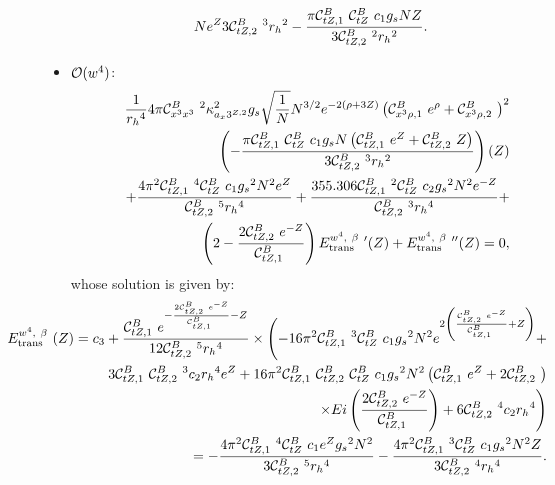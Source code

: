 \begin{itemize}
{\begin{eqnarray}
{   N e^Z}{3 {\cal C}_{tZ,2}^B\ ^3 {r_h}^2}-\frac{\pi 
   {\cal C}_{tZ,1}^B\  {\cal C}_{tZ}^B\  c_1 {g_s} N Z}{3
   {\cal C}_{tZ,2}^B\ ^2 {r_h}^2}.
\end{eqnarray}
}
\item
${\cal O}(w^4)$:\\
\begin{eqnarray}
\label{EOMw4}
& & \hskip -0.5in \frac{1}{{{r_h}^4}}4 \pi  {\cal C}_{x^3x^3}^B\ ^2 \kappa_{a_x3^{Z,2}}^2 {g_s}
   \sqrt{\frac{1}{N}} N^{3/2} e^{-2 (\rho +3 Z)}
    \left({\cal C}_{x^3\rho,1}^B\  e^{\rho }+{\cal C}_{x^3\rho, 2}^B\ \right)^2 \nonumber \\ & & \left(-\frac{\pi  {\cal C}_{tZ,1}^B\ 
   {\cal C}_{tZ}^B\  c_1 {g_s} N \left({\cal C}_{tZ,1}^B\ 
   e^Z+{\cal C}_{tZ,2}^B\  Z\right)}{3 {\cal C}_{tZ,2}^B\ ^3
   {r_h}^2}\right)(Z)\nonumber\\
& & +\frac{4 \pi ^2
   {\cal C}_{tZ,1}^B\ ^4 {\cal C}_{tZ}^B\  c_1 {g_s}^2 N^2
   e^Z}{{\cal C}_{tZ,2}^B\ ^5 {r_h}^4}+\frac{355.306
   {\cal C}_{tZ,1}^B\ ^2 {\cal C}_{tZ}^B\  c_2 {g_s}^2 N^2
        e^{-Z}}{{\cal C}_{tZ,2}^B\ ^3 {r_h}^4}+ \nonumber \\ & & \left(2-\frac{2
   {\cal C}_{tZ,2}^B\  e^{-Z}}{{\cal C}_{tZ,1}^B\ }\right)
   E_{\rm trans}^{w^4,\ \beta}\ '(Z) + E_{\rm trans}^{w^4,\ \beta}\ ''(Z)=0,
\end{eqnarray}
whose solution is given by:
{\footnotesize
\begin{eqnarray}
\label{EOMw4-sol}
& & \hskip -0.8in E_{\rm trans}^{w^4,\ \beta}\ (Z) = c_3 + \frac{{\cal C}_{tZ,1}^B\  e^{-\frac{2
   {\cal C}_{tZ,2}^B\  e^{-Z}}{{\cal C}_{tZ,1}^B\ }-Z} }{12
   {\cal C}_{tZ,2}^B\ ^5 {r_h}^4} \times \Biggl(-16 \pi
   ^2 {\cal C}_{tZ,1}^B\ ^3 {\cal C}_{tZ}^B\  c_1 {g_s}^2 N^2
   e^{2 \left(\frac{{\cal C}_{tZ,2}^B\ 
   e^{-Z}}{{\cal C}_{tZ,1}^B\ }+Z\right)}+ \nonumber \\ 
& & 3 {\cal C}_{tZ,1}^B\ 
   {\cal C}_{tZ,2}^B\ ^3 c_2 {r_h}^4 e^Z+16 \pi ^2
   {\cal C}_{tZ,1}^B\  {\cal C}_{tZ,2}^B\  {\cal C}_{tZ}^B\  c_1
   {g_s}^2 N^2 \left({\cal C}_{tZ,1}^B\  e^Z+2
   {\cal C}_{tZ,2}^B\ \right)\nonumber\\
& & \times    {Ei}\left(\frac{2
   {\cal C}_{tZ,2}^B\  e^{-Z}}{{\cal C}_{tZ,1}^B\ }\right)+6
   {\cal C}_{tZ,2}^B\ ^4 c_2 {r_h}^4\Biggr) \nonumber \\ 
& & = -\frac{4 \pi ^2 {\cal C}_{tZ,1}^B\ ^4 {\cal C}_{tZ}^B\  c_1
   {e^Z} {g_s}^2 N^2}{3 {\cal C}_{tZ,2}^B\ ^5
   {r_h}^4}-\frac{4 \pi ^2 {\cal C}_{tZ,1}^B\ ^3
   {\cal C}_{tZ}^B\  c_1 {g_s}^2 N^2 Z}{3
   {\cal C}_{tZ,2}^B\ ^4 {r_h}^4}.
\end{eqnarray}
}
\end{itemize}
